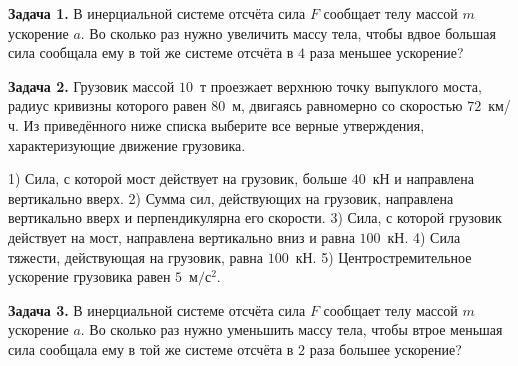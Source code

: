 
\begin{taskbasic}[code={\label{task:newton2_v1_n2}}]
\textbf{Задача 1.} В инерциальной системе отсчёта сила $F$ сообщает телу массой $m$ ускорение $a$. Во сколько раз нужно увеличить массу тела, чтобы вдвое большая сила сообщала ему в той же системе отсчёта в $4$ раза меньшее ускорение?

\end{taskbasic}

\begin{taskbasic}[code={\label{task:newton2_v1_n5}}]
\textbf{Задача 2.} Грузовик массой $10$~т проезжает верхнюю точку выпуклого моста, радиус кривизны которого равен $80$~м, двигаясь равномерно со скоростью $72$~км/ч. Из приведённого ниже списка выберите все верные утверждения, характеризующие движение грузовика.

1) Сила, с которой мост действует на грузовик, больше $40$~кН и направлена вертикально вверх.
2) Сумма сил, действующих на грузовик, направлена вертикально вверх и перпендикулярна его скорости.
3) Сила, с которой грузовик действует на мост, направлена вертикально вниз и равна $100$~кН.
4) Сила тяжести, действующая на грузовик, равна $100$~кН.
5) Центростремительное ускорение грузовика равен $5$~$м/с^2$.

\end{taskbasic}

\begin{taskbasic}[code={\label{task:newton2_v2_n2}}]
\textbf{Задача 3.} В инерциальной системе отсчёта сила $F$ сообщает телу массой $m$ ускорение $a$. Во сколько раз нужно уменьшить массу тела, чтобы втрое меньшая сила сообщала ему в той же системе отсчёта в $2$ раза большее ускорение?

\end{taskbasic}

